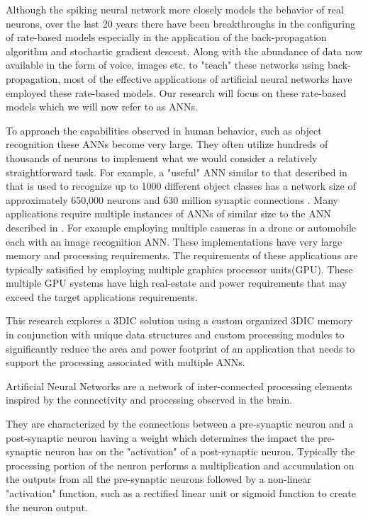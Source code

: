 Although the spiking neural network more closely models the behavior of real neurons, over the last 20 years there 
have been breakthroughs in the configuring of rate-based models especially in the application of the back-propagation
algorithm and stochastic gradient descent. Along with the abundance of data now available in the form of voice, images etc. to "teach" these networks
using back-propagation, most of the effective applications of artificial neural networks have employed these rate-based models.
Our research will focus on these rate-based models which we will now refer to as ANNs.
\fi

To approach the capabilities observed in human behavior, such as object recognition these ANNs become very large.
They often utilize hundreds of thousands of neurons to implement what we would consider a relatively straightforward task.
For example, a "useful" ANN similar to that described in \cite{krizhevsky2012imagenet} that is used
to recognize up to 1000 different object classes has a network size of approximately 650,000 neurons and 
630 million synaptic connections \cite{krizhevsky2012imagenetPreso}. 
Many applications require multiple instances of ANNs of similar size to the ANN described in \cite{krizhevsky2012imagenet}.
For example employing multiple cameras in a drone or automobile each with an image recognition ANN\cite{krizhevsky2012imagenet}\cite{bojarski2016end}.
These implementations have very large memory and processing requirements.
The requirements of these applications are typically satisified by employing multiple graphics processor units(GPU).
These multiple GPU systems have high real-estate and power requirements that may exceed the target applications requirements.

This research explores a 3DIC solution using a custom organized 3DIC memory in conjunction with unique data structures and custom processing modules to significantly reduce the 
area and power footprint of an application that needs to support the processing associated with multiple ANNs.


Artificial Neural Networks are a network of inter-connected processing elements inspired by the 
connectivity and processing observed in the brain.

They are characterized by the connections between a pre-synaptic neuron and a post-synaptic neuron having a weight which determines the impact the pre-synaptic neuron has on the 
"activation" of a post-synaptic neuron.
Typically the processing portion of the neuron performs a multiplication and accumulation on the outputs from all
the pre-synaptic neurons followed by a non-linear "activation" function, such as a rectified linear unit or sigmoid function to create the neuron output.


